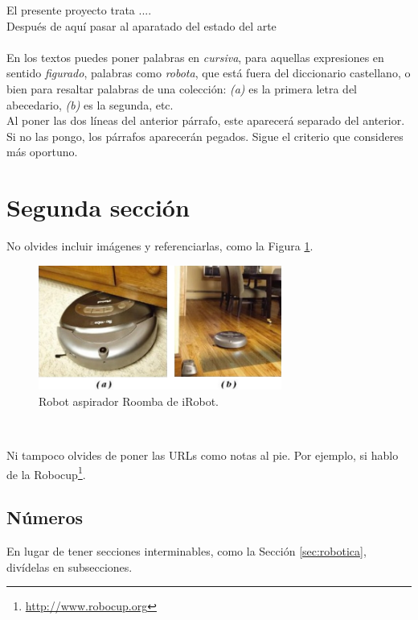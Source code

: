 El presente proyecto trata ....\\


Después de aquí pasar al aparatado del estado del arte \\\\

En los textos puedes poner palabras en \textit{cursiva}, para aquellas expresiones en sentido \textit{figurado}, palabras como \textit{robota}, que está fuera del diccionario castellano, o bien para resaltar palabras de una colección: \textit{(a)} es la primera letra del abecedario, \textit{(b)} es la segunda, etc.\\

Al poner las dos líneas del anterior párrafo, este aparecerá separado del anterior. Si no las pongo, los párrafos aparecerán pegados. Sigue el criterio que consideres más oportuno.

\section{Segunda sección}
\label{sec:segundaseccion}

No olvides incluir imágenes y referenciarlas, como la Figura \ref{fig:roomba}.

\begin{figure} [h!]
  \begin{center}
    \includegraphics[width=8cm]{figs/roomba}
  \end{center}
  \caption{Robot aspirador Roomba de iRobot.}
  \label{fig:roomba}
\end{figure}\

Ni tampoco olvides de poner las URLs como notas al pie. Por ejemplo, si hablo de la Robocup\footnote{\url{http://www.robocup.org}}.

\subsection{Números}
\label{sec:subseccion}

En lugar de tener secciones interminables, como la Sección \ref{sec:robotica}, divídelas en subsecciones.

